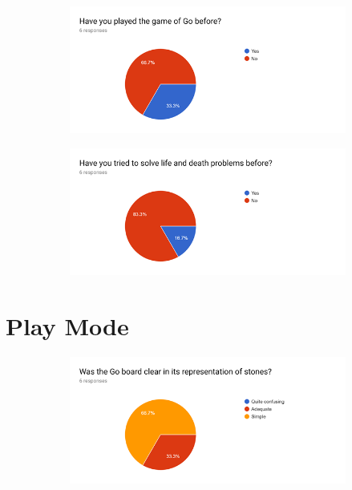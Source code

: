 \documentclass{l4proj}
\begin{document}
\begin{appendices}
\begin{figure}[!ht]
\centering
\begin{subfigure}[b]{\textwidth}
\centering
\includegraphics[width=\textwidth]{A1/2.png}
\end{subfigure}
\end{figure}


\begin{figure}[H]
\centering
\begin{subfigure}[b]{\textwidth}
\centering
\includegraphics[width=\textwidth]{A1/3.png}
\end{subfigure}
\end{figure}

\section{Play Mode}

\begin{figure}[H]
\centering
\begin{subfigure}[b]{\textwidth}
\centering
\includegraphics[width=\textwidth]{A1/4.png}
\end{subfigure}
\end{figure}



\end{appendices}
\end{document}
